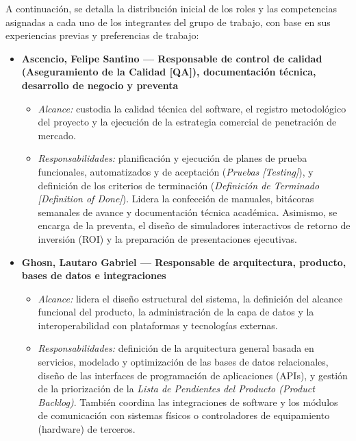 A continuación, se detalla la distribución inicial de los roles y las competencias asignadas a cada uno de los integrantes del grupo de trabajo, con base en sus experiencias previas y preferencias de trabajo:

\begin{itemize}
    \item \textbf{Ascencio, Felipe Santino — Responsable de control de calidad (Aseguramiento de la Calidad [QA]), documentación técnica, desarrollo de negocio y preventa}
    \begin{itemize}
        \item \textit{Alcance:} custodia la calidad técnica del software, el registro metodológico del proyecto y la ejecución de la estrategia comercial de penetración de mercado.
        \item \textit{Responsabilidades:} planificación y ejecución de planes de prueba funcionales, automatizados y de aceptación (\textit{Pruebas [Testing]}), y definición de los criterios de terminación (\textit{Definición de Terminado [Definition of Done]}). Lidera la confección de manuales, bitácoras semanales de avance y documentación técnica académica. Asimismo, se encarga de la preventa, el diseño de simuladores interactivos de retorno de inversión (ROI) y la preparación de presentaciones ejecutivas.
    \end{itemize}

    \newpage

    \item \textbf{Ghosn, Lautaro Gabriel — Responsable de arquitectura, producto, bases de datos e integraciones}
    \begin{itemize}
        \item \textit{Alcance:} lidera el diseño estructural del sistema, la definición del alcance funcional del producto, la administración de la capa de datos y la interoperabilidad con plataformas y tecnologías externas.
        \item \textit{Responsabilidades:} definición de la arquitectura general basada en servicios, modelado y optimización de las bases de datos relacionales, diseño de las interfaces de programación de aplicaciones (APIs), y gestión de la priorización de la \textit{Lista de Pendientes del Producto (Product Backlog)}. También coordina las integraciones de software y los módulos de comunicación con sistemas físicos o controladores de equipamiento (hardware) de terceros.
    \end{itemize}


\end{itemize}
